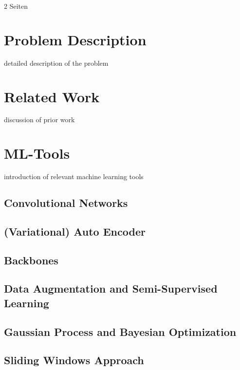 2 Seiten

\section{Problem Description}
detailed description of the problem
\section{Related Work}
discussion of prior work

\section{ML-Tools}
introduction of relevant machine learning tools

\subsection{Convolutional Networks}
\subsection{(Variational) Auto Encoder}
\subsection{Backbones}
\subsection{Data Augmentation and Semi-Supervised Learning}
\subsection{Gaussian Process and Bayesian Optimization}
\subsection{Sliding Windows Approach}
